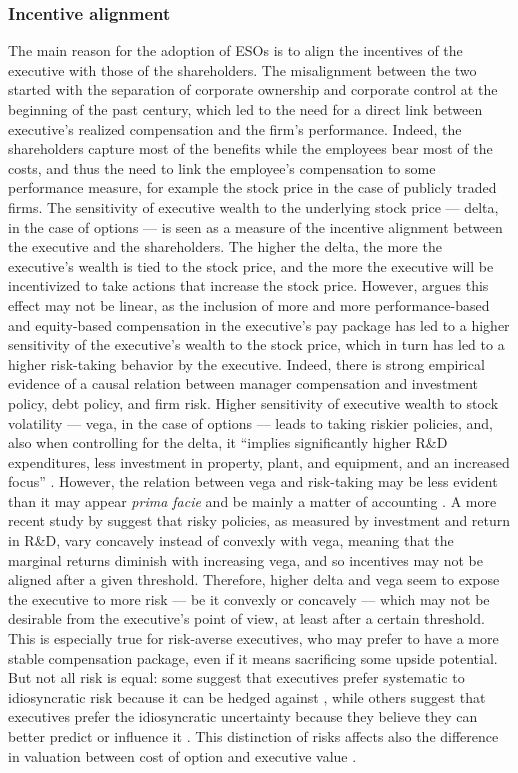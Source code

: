 \subsubsection{Incentive alignment} 
    The main reason for the adoption of ESOs is to align the incentives of the executive with those of the shareholders. The misalignment between the two started with the separation of corporate ownership and corporate control at the beginning of the past century, which led to the need for a direct link between executive's realized compensation and the firm's performance. Indeed, the shareholders capture most of the benefits while the employees bear most of the costs, and thus the need to link the employee's compensation to some performance measure, for example the stock price in the case of publicly traded firms. 
    The sensitivity of executive wealth to the underlying stock price --- delta, in the case of options --- is seen as a measure of the incentive alignment between the executive and the shareholders. The higher the delta, the more the executive's wealth is tied to the stock price, and the more the executive will be incentivized to take actions that increase the stock price. However, \citet{coles2006managerial} argues this effect may not be linear, as the inclusion of more and more performance-based and equity-based compensation in the executive's pay package has led to a higher sensitivity of the executive's wealth to the stock price, which in turn has led to a higher risk-taking behavior by the executive. Indeed, there is strong empirical evidence of a causal relation between manager compensation and investment policy, debt policy, and firm risk. Higher sensitivity of executive wealth to stock volatility --- vega, in the case of options --- leads to taking riskier policies, and, also when controlling for the delta, it ``implies significantly higher R\&D expenditures, less investment in property, plant, and equipment, and an increased focus'' \citep{coles2006managerial}. However, the relation between vega and risk-taking may be less evident than it may appear \textit{prima facie} and be mainly a matter of accounting \citep{hayes2012stock}. A more recent study by \citet{billings2020can} suggest that risky policies, as measured by investment and return in R\&D, vary concavely instead of convexly with vega, meaning that the marginal returns diminish with increasing vega, and so incentives may not be aligned after a given threshold.
    Therefore, higher delta and vega seem to expose the executive to more risk --- be it convexly or concavely --- which may not be desirable from the executive's point of view, at least after a certain threshold. This is especially true for risk-averse executives, who may prefer to have a more stable compensation package, even if it means sacrificing some upside potential. But not all risk is equal: some suggest that executives prefer systematic to idiosyncratic risk because it can be hedged against \citep{armstrong2012executive}, while others suggest that executives prefer the idiosyncratic uncertainty because they believe they can better predict or influence it \citep{heron2017stock}. This distinction of risks affects also the difference in valuation between cost of option and executive value \citep{meulbroek2001efficiency}.
